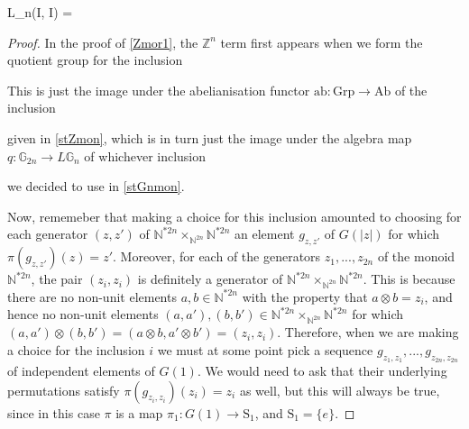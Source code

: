 \begin{prop} \label{identityquot}

\begin{eq*} L_n(I, I) \quad = \quad {} \end{eq*}

\end{prop}
\begin{proof}
In the proof of \cref{Zmor1}, the $\mathbb{Z}^n$ term first appears when we form the quotient group for the inclusion
\begin{eq*}  \end{eq*}
This is just the image under the abelianisation functor $\mathrm{ab}: \mathrm{Grp} \to \mathrm{Ab}$ of the inclusion
\begin{eq*}  \end{eq*}
given in \cref{stZmon}, which is in turn just the image under the algebra map $q: \mathbb{G}_{2n} \to L\mathbb{G}_n$ of whichever inclusion
\begin{eq*}  \end{eq*}
we decided to use in \cref{stGnmon}. 

Now, rememeber that making a choice for this inclusion amounted to choosing for each generator $(z, z')$ of $\mathbb{N}^{\ast 2n} \times_{\mathbb{N}^{2n}} \mathbb{N}^{\ast 2n}$ an element $g_{z, z'}$ of $G(|z|)$ for which $\pi(g_{z, z'})(z) = z'$. Moreover, for each of the generators $z_1, ..., z_{2n}$ of the monoid $\mathbb{N}^{\ast 2n}$, the pair $(z_i, z_i)$ is definitely a generator of $\mathbb{N}^{\ast 2n} \times_{\mathbb{N}^{2n}} \mathbb{N}^{\ast 2n}$. This is because there are no non-unit elements $a, b \in \mathbb{N}^{\ast 2n}$ with the property that $a \otimes b = z_i$, and hence no non-unit elements $(a, a'), (b, b') \in \mathbb{N}^{\ast 2n} \times_{\mathbb{N}^{2n}} \mathbb{N}^{\ast 2n}$ for which $(a, a') \otimes (b, b') = (a \otimes b, a' \otimes b') = (z_i, z_i)$. Therefore, when we are making a choice for the inclusion $i$ we must at some point pick a sequence $g_{z_1, z_1}, ..., g_{z_{2n}, z_{2n}}$ of independent elements of $G(1)$. We would need to ask that their underlying permutations satisfy $\pi(g_{z_i, z_i})(z_i) = z_i$ as well, but this will always be true, since in this case $\pi$ is a map $\pi_1 : G(1) \to \mathrm{S}_1$, and $\mathrm{S}_1 = \{e\}$.


\end{proof}
